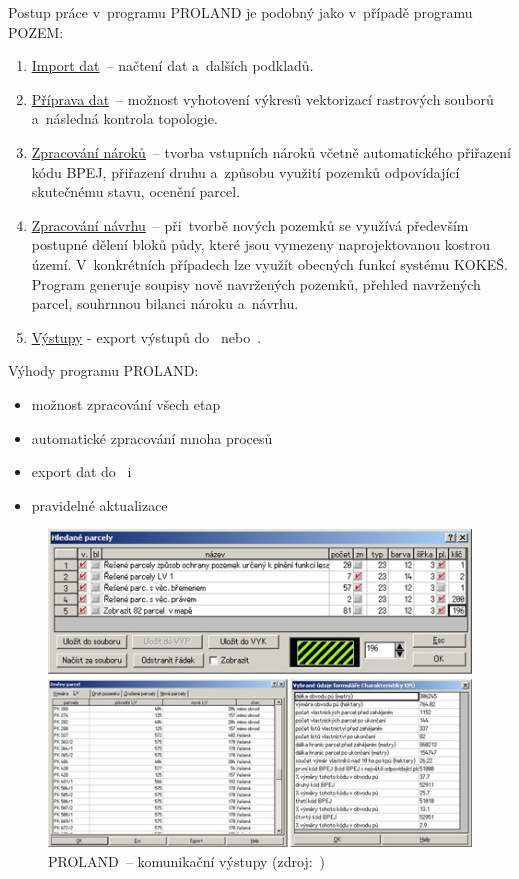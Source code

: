 Postup práce v~programu PROLAND je podobný jako v~případě programu POZEM:
\vspace{-\topsep}
	\begin{enumerate}[leftmargin=1.5cm, noitemsep]
		\item \underline{Import dat}~– načtení dat  a~dalších podkladů.
		\item \underline{Příprava dat}~– možnost vyhotovení výkresů vektorizací rastrových souborů a~následná kontrola topologie.
		\item \underline{Zpracování nároků}~– tvorba vstupních nároků včetně automatického přiřaze\-ní kódu BPEJ, přiřazení druhu a~způsobu využití pozemků odpovídající skutečnému stavu, ocenění parcel.
		\item \underline{Zpracování návrhu}~– při~tvorbě nových pozemků se využívá především postupné dělení bloků půdy, které jsou vymezeny naprojektovanou kostrou území. V~konkrétních případech lze využít obecných funkcí systému KOKEŠ. Program generuje soupisy nově navržených pozemků, přehled navržených parcel, souhrnnou bilanci nároku a~návrhu.
		\item \underline{Výstupy} - export výstupů do~ nebo~.
	\end{enumerate}

Výhody programu PROLAND:
\vspace{-\topsep}
	\begin{itemize}[leftmargin=1.5cm, noitemsep]
		\item možnost zpracování všech etap 
		\item automatické zpracování mnoha procesů 
		\item export dat do~ i~
		\item pravidelné aktualizace
	\end{itemize}

	\begin{figure}[H]
		\centering
		\includegraphics[width=.8\textwidth]{./pictures/proland.png}
		\caption[PROLAND~– komunikační výstupy]{PROLAND~– komunikační výstupy (zdroj:~\citep{proland_obrazek})}
		\label{fig:proland_obrazek}
 	\end{figure}

